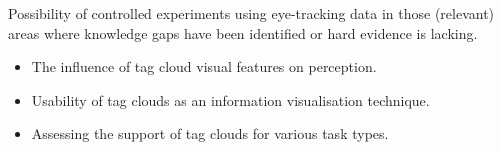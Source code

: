 
Possibility of controlled experiments using eye-tracking data in those (relevant) areas where knowledge gaps have been identified or hard evidence is lacking. 

\begin{itemize}
	\item The influence of tag cloud visual features on perception.
	\item Usability of tag clouds as an information visualisation technique.
	\item Assessing the support of tag clouds for various task types.
\end{itemize}



